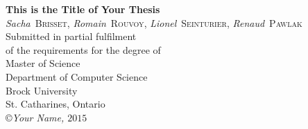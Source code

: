 \begin{titlepage}
\begin{center}

{\LARGE {\bf 
This is the Title of Your Thesis}}
\\[3cm]
\emph{Sacha}~\textsc{Brisset},
\emph{Romain}~\textsc{Rouvoy},
\emph{Lionel}~\textsc{Seinturier},
\emph{Renaud}~\textsc{Pawlak}
\\[3cm]
{\large Submitted in partial fulfilment\\ of the requirements for the degree of\\ [1cm]
Master of Science}
\\[4cm]
{\large Department of Computer Science\\Brock University\\
St. Catharines, Ontario}
\\[5cm]
\copyright \textit{Your Name, $ 2015 $}

\end{center}
\end{titlepage}

